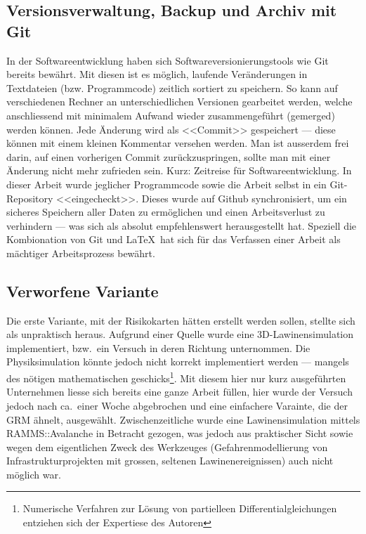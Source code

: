 \subsection{Versionsverwaltung, Backup und Archiv mit Git}

In der Softwareentwicklung haben sich Softwareversionierungstools wie Git bereits bewährt. Mit diesen ist es möglich, laufende Veränderungen in Textdateien (bzw. Programmcode) zeitlich sortiert zu speichern. So kann auf verschiedenen Rechner an unterschiedlichen Versionen gearbeitet werden, welche anschliessend mit minimalem Aufwand wieder zusammengeführt (gemerged) werden können. Jede Änderung wird als <<Commit>> gespeichert --- diese können mit einem kleinen Kommentar versehen werden. Man ist ausserdem frei darin, auf einen vorherigen Commit zurückzuspringen, sollte man mit einer Änderung nicht mehr zufrieden sein. Kurz: Zeitreise für Softwareentwicklung. 
In dieser Arbeit wurde jeglicher Programmcode sowie die Arbeit selbst in ein Git-Repository <<eingecheckt>>. Dieses wurde auf Github synchronisiert, um ein sicheres Speichern aller Daten zu ermöglichen und einen Arbeitsverlust zu verhindern --- was sich als absolut empfehlenswert herausgestellt hat. Speziell die Kombionation von Git und \LaTeX\ hat sich für das Verfassen einer Arbeit als mächtiger Arbeitsprozess bewährt.

\subsection{Verworfene Variante}

Die erste Variante, mit der Risikokarten hätten erstellt werden sollen, stellte sich als unpraktisch heraus. Aufgrund einer Quelle wurde eine 3D-Lawinensimulation implementiert, bzw.\ ein Versuch in deren Richtung unternommen. Die Physiksimulation könnte jedoch nicht korrekt implementiert werden --- mangels des nötigen mathematischen geschicks\footnote{Numerische Verfahren zur Lösung von partielleen Differentialgleichungen entziehen sich der Expertiese des Autoren}. Mit diesem hier nur kurz ausgeführten Unternehmen liesse sich bereits eine ganze Arbeit füllen, hier wurde der Versuch jedoch nach ca.\ einer Woche abgebrochen und eine einfachere Varainte, die der GRM ähnelt, ausgewählt. Zwischenzeitliche wurde eine Lawinensimulation mittels RAMMS::Avalanche in Betracht gezogen, was jedoch aus praktischer Sicht sowie wegen dem eigentlichen Zweck des Werkzeuges (Gefahrenmodellierung von Infrastrukturprojekten mit grossen, seltenen Lawinenereignissen) auch nicht möglich war.


